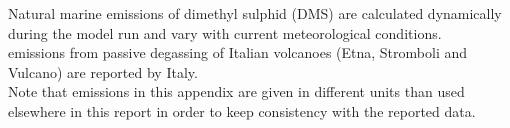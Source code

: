 Natural marine emissions of dimethyl sulphid (DMS) are calculated dynamically during the model run and vary with current meteorological conditions.\\

\sox emissions from passive degassing of Italian volcanoes (Etna, Stromboli and Vulcano) are reported by Italy. \\

Note that emissions in this appendix are given in different units than used elsewhere in this report in order to keep consistency with the reported data.


\clearpage


\renewcommand\bibname{References}    


\clearpage
 
